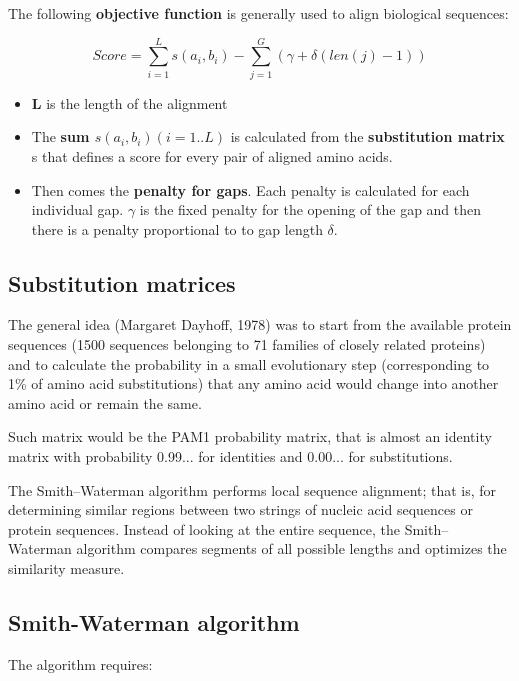 The following \textbf{objective function} is generally used to align biological 
sequences: 

\begin{equation}
Score = \sum_{i=1}^{L} s(a_i,b_i) - \sum_{j=1}^{G} (\gamma + \delta(len(j)-1))
\end{equation}

\begin{itemize}
	\item \textbf{L} is the length of the alignment
	\item The \textbf{sum $ s(a_i,b_i) (i=1..L) $} is calculated from the 
\textbf{substitution 
matrix} s that defines a score for every pair of aligned amino acids.
	\item Then comes the \textbf{penalty for gaps}. Each penalty is calculated
 for each individual gap. \textbf{$\gamma$} is the fixed penalty for the
 opening of the gap and then there is a penalty proportional to to gap length 
\textbf{$\delta$}.
\end{itemize}

\subsection{Substitution matrices}

The general idea (Margaret Dayhoff, 1978) was to start from the available 
protein sequences (1500 sequences belonging to 71 families of closely related 
proteins) and to calculate the probability in a small evolutionary step 
(corresponding to 1\% of amino acid substitutions) that any amino acid would 
change into another amino acid or remain the same.

Such matrix would be the PAM1 probability matrix, that is almost an identity 
matrix with probability 0.99... for identities and 0.00... for substitutions.

The Smith–Waterman algorithm performs local sequence alignment; that is, for 
determining similar regions between two strings of nucleic acid sequences or 
protein sequences. Instead of looking at the entire sequence, the 
Smith–Waterman algorithm compares segments of all possible lengths and 
optimizes the similarity measure.

\subsection{Smith-Waterman algorithm}

The algorithm requires:

